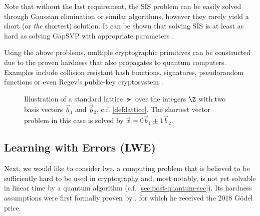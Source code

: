 Note that without the last requirement, the SIS problem can be easily solved through Gaussian elimination or
similar algorithms, however they rarely yield a short (or \textit{the} shortest) solution.
It can be shown that solving SIS is at least as hard as solving GapSVP with appropriate parameters
\parencite{1996-hard-lattice-problems}.

Using the above problems, multiple cryptographic primitives can be constructed
due to the proven hardness that also propagates to quantum computers.
Examples include collision resistant hash functions, signatures, pseudorandom functions
or even Regev's public-key cryptosystem \parencite{2016-decade-of-lattice}.

\usetikzlibrary{calc}
\begin{figure}
  \centering
  \caption{Illustration of a standard lattice $\lat$ over the integers $\Z$
    with two basis vectors $\vec{b}_1$ and $\vec{b}_2$, c.f. \autoref{def:lattice}.
    The shortest vector problem in this case is solved by $\vec{x} = 0 \vec{b}_1 \pm 1 \vec{b}_2$.}
  \label{fig:lattice}
\end{figure}

\subsection{Learning with Errors (LWE)}
\label{subsec:lwe}
Next, we would like to consider \Gls{lwe}, a computing problem that is believed to be sufficiently hard
to be used in cryptography and, most notably, is not yet solvable in linear time by a quantum algorithm
(c.f. \autoref{sec:post-quantum-sec}).
Its hardness assumptions were first formally proven by \citeauthor{2005-lwe-original},
for which he received the 2018 Gödel price.

